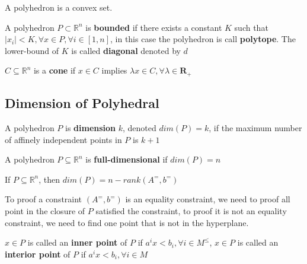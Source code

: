 					\begin{proposition}
						A polyhedron is a convex set.
					\end{proposition}

					\begin{definition}[polytope]
						A polyhedron $P \subset \mathbb{R}^n$ is \textbf{bounded} if there exists a constant $K$ such that $|x_i|<K, \forall x \in P, \forall i \in [1, n]$, in this case the polyhedron is call \textbf{polytope}. The lower-bound of $K$ is called \textbf{diagonal} denoted by $d$
					\end{definition}

					\begin{definition}[cone]
						$C \subseteq \mathbb{R}^n$ is a \textbf{cone} if $x \in C$ implies $\lambda x\in C, \forall \lambda \in \mathbf{R}_{+}$
					\end{definition}

				\subsection{Dimension of Polyhedral}
					\begin{definition}[dimension]
						A polyhedron $P$ is \textbf{dimension} $k$, denoted $dim(P)=k$, if the maximum number of affinely independent points in $P$ is $k+1$
					\end{definition}

					\begin{definition}
						A polyhedron $P\subseteq \mathbb{R}^n$ is \textbf{full-dimensional} if $dim(P) = n$
					\end{definition}

					\begin{proposition}
						If $P\subseteq \mathbb{R}^n$, then $dim(P) = n - rank(A^=, b^=)$
					\end{proposition}

					To proof a constraint $(A^=, b^=)$ is an equality constraint, we need to proof all point in the closure of $P$ satisfied the constraint, to proof it is not an equality constraint, we need to find one point that is not in the hyperplane.

					\begin{definition}
						$x\in P$ is called an \textbf{inner point} of $P$ if $a^ix < b_i, \forall i \in M^\le$, $x\in P$ is called an \textbf{interior point} of $P$ if $a^ix<b_i, \forall i \in M$
					\end{definition}

